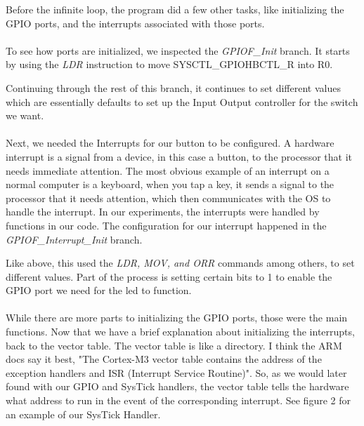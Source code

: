 \documentclass[12pt,a4paper]{report}
\begin{document}
Before the infinite loop, the program did a few other tasks, like initializing the GPIO ports, and the interrupts associated with those ports.  

\paragraph{}
To see how ports are initialized, we inspected the \textit{GPIOF\_Init} branch. It starts by using the \textit{LDR} instruction to move SYSCTL\_GPIOHBCTL\_R into R0. 

Continuing through the rest of this branch, it continues to set different values which are essentially defaults to set up the Input Output controller for the switch we want.

\paragraph{}
Next, we needed the Interrupts for our button to be configured. A hardware interrupt is a signal from a device, in this case a button, to the processor that it needs immediate attention. The most obvious example of an interrupt on a normal computer is a keyboard, when you tap a key, it sends a signal to the processor that it needs attention, which then communicates with the OS to handle the interrupt. In our experiments, the interrupts were handled by functions in our code.
The configuration for our interrupt happened in the \textit{GPIOF\_Interrupt\_Init} branch. 

Like above, this used the \textit{LDR, MOV, and ORR} commands among others, to set different values. Part of the process is setting certain bits to 1 to enable the GPIO port we need for the led to function. 

\paragraph{}
While there are more parts to initializing the GPIO ports, those were the main functions. Now that we have a brief explanation about initializing the interrupts, back to the vector table. The vector table is like a directory. I think the ARM docs say it best, "The Cortex-M3 vector table contains the address of the exception handlers and ISR (Interrupt Service Routine)". So, as we would later found with our GPIO and SysTick handlers, the vector table tells the hardware what address to run in the event of the corresponding interrupt. See figure 2 for an example of our SysTick Handler. 
\end{document}
